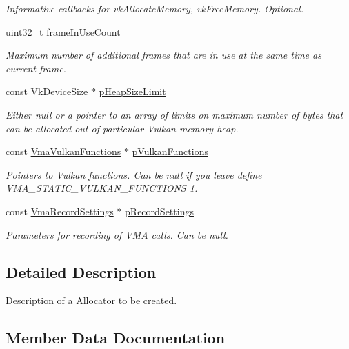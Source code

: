 \begin{DoxyCompactItemize}
\begin{DoxyCompactList}\small\item\em Informative callbacks for {\ttfamily vk\+Allocate\+Memory}, {\ttfamily vk\+Free\+Memory}. Optional. \end{DoxyCompactList}\item 
uint32\+\_\+t \hyperlink{structVmaAllocatorCreateInfo_a21ea188dd212b8171cb9ecbed4a2a3a7}{frame\+In\+Use\+Count}
\begin{DoxyCompactList}\small\item\em Maximum number of additional frames that are in use at the same time as current frame. \end{DoxyCompactList}\item 
const Vk\+Device\+Size $\ast$ \hyperlink{structVmaAllocatorCreateInfo_a31c192aa6cbffa33279f6d9f0c47c44b}{p\+Heap\+Size\+Limit}
\begin{DoxyCompactList}\small\item\em Either null or a pointer to an array of limits on maximum number of bytes that can be allocated out of particular Vulkan memory heap. \end{DoxyCompactList}\item 
const \hyperlink{structVmaVulkanFunctions}{Vma\+Vulkan\+Functions} $\ast$ \hyperlink{structVmaAllocatorCreateInfo_a3dc197be3227da7338b1643f70db36bd}{p\+Vulkan\+Functions}
\begin{DoxyCompactList}\small\item\em Pointers to Vulkan functions. Can be null if you leave define {\ttfamily V\+M\+A\+\_\+\+S\+T\+A\+T\+I\+C\+\_\+\+V\+U\+L\+K\+A\+N\+\_\+\+F\+U\+N\+C\+T\+I\+O\+NS 1}. \end{DoxyCompactList}\item 
const \hyperlink{structVmaRecordSettings}{Vma\+Record\+Settings} $\ast$ \hyperlink{structVmaAllocatorCreateInfo_ace2aa4877b16a42b0b7673d4e26000ee}{p\+Record\+Settings}
\begin{DoxyCompactList}\small\item\em Parameters for recording of V\+MA calls. Can be null. \end{DoxyCompactList}\end{DoxyCompactItemize}


\subsection{Detailed Description}
Description of a Allocator to be created. 

\subsection{Member Data Documentation}
\mbox{\label{structVmaAllocatorCreateInfo_ad924ddd77b04039c88d0c09b0ffcd500}} 
